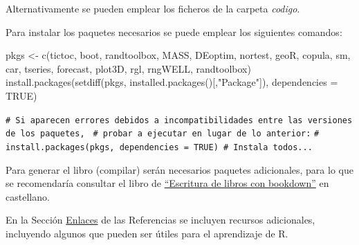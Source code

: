 \documentclass[
  10pt,
]{book}
\newenvironment{Shaded}{\begin{snugshade}}{\end{snugshade}}
\newcommand{\AttributeTok}[1]{\textcolor[rgb]{0.77,0.63,0.00}{#1}}
\newcommand{\CommentTok}[1]{\textcolor[rgb]{0.56,0.35,0.01}{\textit{#1}}}
\newcommand{\ConstantTok}[1]{\textcolor[rgb]{0.00,0.00,0.00}{#1}}
\newcommand{\FunctionTok}[1]{\textcolor[rgb]{0.00,0.00,0.00}{#1}}
\newcommand{\NormalTok}[1]{#1}
\newcommand{\OtherTok}[1]{\textcolor[rgb]{0.56,0.35,0.01}{#1}}
\newcommand{\StringTok}[1]{\textcolor[rgb]{0.31,0.60,0.02}{#1}}
\theoremstyle{break}
\theoremstyle{nonumberplain}
\renewcommand{\CommentTok}[1]{\textcolor[rgb]{0.41,0.41,0.41}{\texttt{#1}}}
\begin{document}
Alternativamente se pueden emplear los ficheros de la carpeta \emph{codigo}.

Para instalar los paquetes necesarios se puede emplear los siguientes comandos:

\begin{Shaded}
\begin{Highlighting}[]
\NormalTok{pkgs }\OtherTok{\textless{}{-}} \FunctionTok{c}\NormalTok{(}\StringTok{\textquotesingle{}tictoc\textquotesingle{}}\NormalTok{, }\StringTok{\textquotesingle{}boot\textquotesingle{}}\NormalTok{, }\StringTok{\textquotesingle{}randtoolbox\textquotesingle{}}\NormalTok{, }\StringTok{\textquotesingle{}MASS\textquotesingle{}}\NormalTok{, }\StringTok{\textquotesingle{}DEoptim\textquotesingle{}}\NormalTok{, }\StringTok{\textquotesingle{}nortest\textquotesingle{}}\NormalTok{, }\StringTok{\textquotesingle{}geoR\textquotesingle{}}\NormalTok{, }\StringTok{\textquotesingle{}copula\textquotesingle{}}\NormalTok{,}
          \StringTok{\textquotesingle{}sm\textquotesingle{}}\NormalTok{, }\StringTok{\textquotesingle{}car\textquotesingle{}}\NormalTok{, }\StringTok{\textquotesingle{}tseries\textquotesingle{}}\NormalTok{, }\StringTok{\textquotesingle{}forecast\textquotesingle{}}\NormalTok{, }\StringTok{\textquotesingle{}plot3D\textquotesingle{}}\NormalTok{, }\StringTok{\textquotesingle{}rgl\textquotesingle{}}\NormalTok{, }\StringTok{\textquotesingle{}rngWELL\textquotesingle{}}\NormalTok{, }\StringTok{\textquotesingle{}randtoolbox\textquotesingle{}}\NormalTok{)}
\FunctionTok{install.packages}\NormalTok{(}\FunctionTok{setdiff}\NormalTok{(pkgs, }\FunctionTok{installed.packages}\NormalTok{()[,}\StringTok{"Package"}\NormalTok{]), }
                 \AttributeTok{dependencies =} \ConstantTok{TRUE}\NormalTok{)}

\CommentTok{\# Si aparecen errores debidos a incompatibilidades entre las versiones de los paquetes, }
\CommentTok{\# probar a ejecutar en lugar de lo anterior:}
\CommentTok{\# install.packages(pkgs, dependencies = TRUE) \# Instala todos...}
\end{Highlighting}
\end{Shaded}

Para generar el libro (compilar) serán necesarios paquetes adicionales,
para lo que se recomendaría consultar el libro de \href{https://rubenfcasal.github.io/bookdown_intro}{``Escritura de libros con bookdown''} en castellano.

En la Sección \protect\hyperlink{links}{Enlaces} de las Referencias se incluyen recursos adicionales, incluyendo algunos que pueden ser útiles para el aprendizaje de R.
\end{document}
